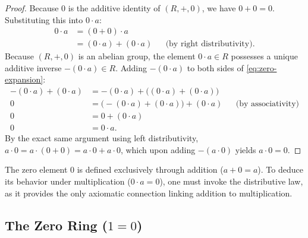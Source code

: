 \begin{content}

\begin{proof}
Because $0$ is the additive identity of $(R, +, 0)$, we have $0 + 0 = 0$. Substituting this into $0 \cdot a$:
\begin{align}
0 \cdot a &= (0 + 0) \cdot a \nonumber \\
&= (0 \cdot a) + (0 \cdot a) && \text{(by right distributivity)}. \label{eq:zero-expansion}
\end{align}
Because $(R, +, 0)$ is an abelian group, the element $0 \cdot a \in R$ possesses a unique additive inverse $-(0 \cdot a) \in R$. Adding $-(0 \cdot a)$ to both sides of \eqref{eq:zero-expansion}:
\begin{align*}
-(0 \cdot a) + (0 \cdot a) &= -(0 \cdot a) + \bigl((0 \cdot a) + (0 \cdot a)\bigr) \\
0 &= \bigl(-(0 \cdot a) + (0 \cdot a)\bigr) + (0 \cdot a) && \text{(by associativity)} \\
0 &= 0 + (0 \cdot a) \\
0 &= 0 \cdot a.
\end{align*}
By the exact same argument using left distributivity, $a \cdot 0 = a \cdot (0 + 0) = a \cdot 0 + a \cdot 0$, which upon adding $-(a \cdot 0)$ yields $a \cdot 0 = 0$.
\end{proof}

\begin{steps}
The zero element $0$ is defined exclusively through addition ($a + 0 = a$). To deduce its behavior under multiplication ($0 \cdot a = 0$), one must invoke the distributive law, as it provides the only axiomatic connection linking addition to multiplication.
\end{steps}
\end{content}

\subsection{The Zero Ring (\texorpdfstring{$1 = 0$}{1 = 0})}

